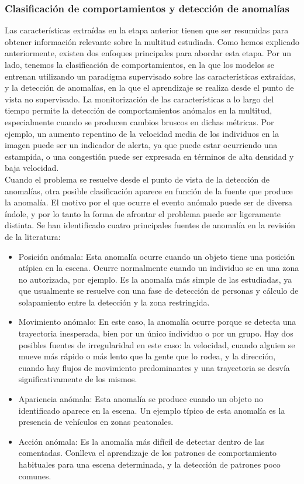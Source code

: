 \documentclass[../main.tex]{memoir}
\begin{document}
\subsubsection{Clasificación de comportamientos y detección de anomalías}
\label{sec:behavior-classification-and-anomaly}

Las características extraídas en la etapa anterior tienen que ser
resumidas para obtener información relevante sobre la multitud
estudiada. Como hemos explicado anteriormente, existen dos enfoques
principales para abordar esta etapa. Por un lado, tenemos la
clasificación de comportamientos, en la que los modelos se entrenan
utilizando un paradigma supervisado sobre las características
extraídas, y la detección de anomalías, en la que el aprendizaje se
realiza desde el punto de vista no supervisado. La monitorización de
las características a lo largo del tiempo permite la detección de
comportamientos anómalos en la multitud, especialmente cuando se
producen cambios bruscos en dichas métricas. Por ejemplo, un aumento
repentino de la velocidad media de los individuos en la imagen puede
ser un indicador de alerta, ya que puede estar ocurriendo una
estampida, o una congestión puede ser expresada en términos de
alta densidad y baja velocidad.\\

Cuando el problema se resuelve desde el punto de vista de la detección
de anomalías, otra posible clasificación aparece en función de la
fuente que produce la anomalía. El motivo por el que ocurre el evento
anómalo puede ser de diversa índole, y por lo tanto la forma de afrontar
el problema puede ser ligeramente distinta. Se han identificado cuatro
principales fuentes de anomalía en la revisión de la literatura:

\begin{itemize}
\item Posición anómala: Esta anomalía ocurre cuando un objeto tiene
  una posición atípica en la escena. Ocurre normalmente cuando un
  individuo se en una zona no autorizada, por ejemplo. Es la anomalía
  más simple de las estudiadas, ya que usualmente se resuelve con una
  fase de detección de personas y cálculo de solapamiento entre la
  detección y la zona restringida.
\item Movimiento anómalo: En este caso, la anomalía ocurre porque se
  detecta una trayectoria inesperada, bien por un único individuo o por
  un grupo. Hay dos posibles fuentes de irregularidad en este caso: la
  velocidad, cuando alguien se mueve más rápido o más lento que la
  gente que lo rodea, y la dirección, cuando hay flujos de movimiento
  predominantes y una trayectoria se desvía significativamente de los
  mismos.
\item Apariencia anómala: Esta anomalía se produce cuando un objeto no
  identificado aparece en la escena. Un ejemplo típico de esta anomalía
  es la presencia de vehículos en zonas peatonales.
\item Acción anómala: Es la anomalía más difícil de detectar dentro de
  las comentadas. Conlleva el aprendizaje de los patrones de
  comportamiento habituales para una escena determinada, y la detección
  de patrones poco comunes.
\end{itemize}
\end{document}
